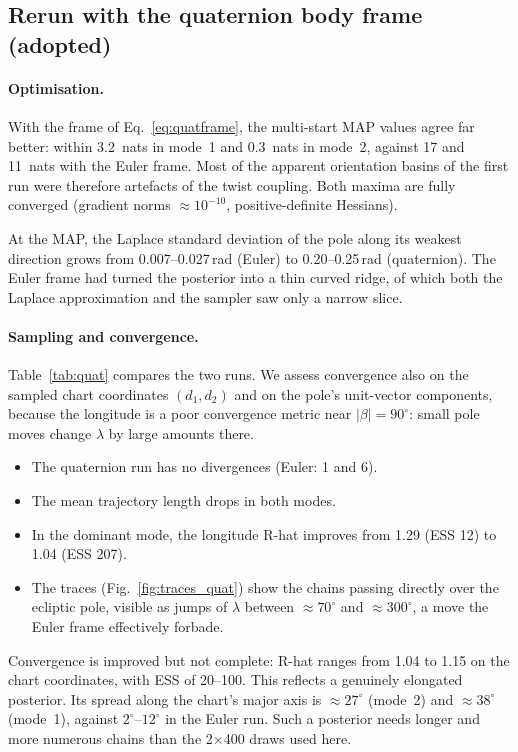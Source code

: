 \documentclass[11pt,a4paper]{article}
\theoremstyle{remark}
\begin{document}
\subsection{Rerun with the quaternion body frame (adopted)}
\label{sec:app_quat}

\paragraph{Optimisation.} With the frame of Eq.~\eqref{eq:quatframe}, the multi-start MAP values agree
far better: within 3.2~nats in mode~1 and 0.3~nats in mode~2, against 17 and 11~nats with the Euler
frame. Most of the apparent orientation basins of the first run were therefore artefacts of the twist
coupling. Both maxima are fully converged (gradient norms $\approx10^{-10}$, positive-definite
Hessians).

At the MAP, the Laplace standard deviation of the pole along its weakest direction grows from
0.007--0.027\,rad (Euler) to 0.20--0.25\,rad (quaternion). The Euler frame had turned the posterior into
a thin curved ridge, of which both the Laplace approximation and the sampler saw only a narrow slice.

\paragraph{Sampling and convergence.} Table~\ref{tab:quat} compares the two runs. We assess convergence
also on the sampled chart coordinates $(d_1,d_2)$ and on the pole's unit-vector components, because the
longitude is a poor convergence metric near $|\beta|=90^\circ$: small pole moves change $\lambda$ by
large amounts there.
\begin{itemize}[nosep]
\item The quaternion run has no divergences (Euler: 1 and 6).
\item The mean trajectory length drops in both modes.
\item In the dominant mode, the longitude R-hat improves from 1.29 (ESS 12) to 1.04 (ESS 207).
\item The traces (Fig.~\ref{fig:traces_quat}) show the chains passing directly over the ecliptic pole,
  visible as jumps of $\lambda$ between $\approx70^\circ$ and $\approx300^\circ$, a move the Euler
  frame effectively forbade.
\end{itemize}
Convergence is improved but not complete: R-hat ranges from 1.04 to 1.15 on the chart coordinates, with
ESS of 20--100. This reflects a genuinely elongated posterior. Its spread along the chart's major axis
is $\approx27^\circ$ (mode~2) and $\approx38^\circ$ (mode~1), against $2^\circ$--$12^\circ$ in the
Euler run. Such a posterior needs longer and more numerous chains than the 2$\times$400 draws used here.
\end{document}
